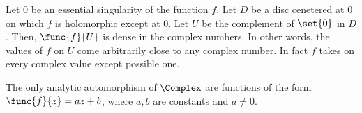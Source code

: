 \begin{theorem}
    Let \(0\) be an essential singularity of the function  \(f\). Let \(D\) be a disc cenetered at \(0\) on which \(f\) is holomorphic except at \(0\). Let \(U\) be the complement of \(\set{0}\) in \(D\). Then, \(\func{f}{U}\) is dense in the complex numbers. In other words, the values of \(f\) on \(U\) come arbitrarily close to any complex number. In fact \(f\) takes on every complex value except possible one. 
\end{theorem}

\begin{theorem}
    The only analytic automorphism of \(\Complex\) are functions of the form \(\func{f}{z} = az + b\), where \(a,b\) are constants and \(a \neq 0\).
\end{theorem}